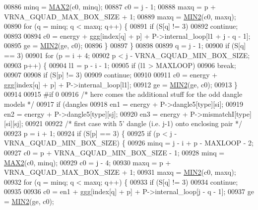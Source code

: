 \begin{DoxyCode}
00886     minq  = \hyperlink{group__utils_ga33297b3679c713b0c4d897cd0fe3b122}{MAX2}(c0, minq);
00887     c0    = j - 1;
00888     maxq  = p + VRNA\_GQUAD\_MAX\_BOX\_SIZE + 1;
00889     maxq  = \hyperlink{group__utils_gae0b9cd0ce090bd69b951aa73e8fa4f7d}{MIN2}(c0, maxq);
00890     \textcolor{keywordflow}{for} (q = minq; q < maxq; q++) \{
00891       \textcolor{keywordflow}{if} (S[q] != 3)
00892         \textcolor{keywordflow}{continue};
00893 
00894       c0  = energy + ggg[index[q] + p] + P->internal\_loop[l1 + j - q - 1];
00895       ge  = \hyperlink{group__utils_gae0b9cd0ce090bd69b951aa73e8fa4f7d}{MIN2}(ge, c0);
00896     \}
00897   \}
00898 
00899   q = j - 1;
00900   \textcolor{keywordflow}{if} (S[q] == 3)
00901     \textcolor{keywordflow}{for} (p = i + 4;
00902          p < j - VRNA\_GQUAD\_MIN\_BOX\_SIZE;
00903          p++) \{
00904       l1 = p - i - 1;
00905       \textcolor{keywordflow}{if} (l1 > MAXLOOP)
00906         \textcolor{keywordflow}{break};
00907 
00908       \textcolor{keywordflow}{if} (S[p] != 3)
00909         \textcolor{keywordflow}{continue};
00910 
00911       c0  = energy + ggg[index[q] + p] + P->internal\_loop[l1];
00912       ge  = \hyperlink{group__utils_gae0b9cd0ce090bd69b951aa73e8fa4f7d}{MIN2}(ge, c0);
00913     \}
00914 
00915 \textcolor{preprocessor}{#if 0}
00916   \textcolor{comment}{/* here comes the additional stuff for the odd dangle models */}
00917   \textcolor{keywordflow}{if} (dangles %
00918     en1 = energy + P->dangle5[type][si];
00919     en2 = energy + P->dangle5[type][sj];
00920     en3 = energy + P->mismatchI[type][si][sj];
00921 
00922     \textcolor{comment}{/* first case with 5' dangle (i.e. j-1) onto enclosing pair */}
00923     p = i + 1;
00924     \textcolor{keywordflow}{if} (S[p] == 3) \{
00925       \textcolor{keywordflow}{if} (p < j - VRNA\_GQUAD\_MIN\_BOX\_SIZE) \{
00926         minq  = j - i + p - MAXLOOP - 2;
00927         c0    = p + VRNA\_GQUAD\_MIN\_BOX\_SIZE - 1;
00928         minq  = \hyperlink{group__utils_ga33297b3679c713b0c4d897cd0fe3b122}{MAX2}(c0, minq);
00929         c0    = j - 4;
00930         maxq  = p + VRNA\_GQUAD\_MAX\_BOX\_SIZE + 1;
00931         maxq  = \hyperlink{group__utils_gae0b9cd0ce090bd69b951aa73e8fa4f7d}{MIN2}(c0, maxq);
00932         \textcolor{keywordflow}{for} (q = minq; q < maxq; q++) \{
00933           \textcolor{keywordflow}{if} (S[q] != 3)
00934             \textcolor{keywordflow}{continue};
00935 
00936           c0  = en1 + ggg[index[q] + p] + P->internal\_loop[j - q - 1];
00937           ge  = \hyperlink{group__utils_gae0b9cd0ce090bd69b951aa73e8fa4f7d}{MIN2}(ge, c0);

\end{DoxyCode}
